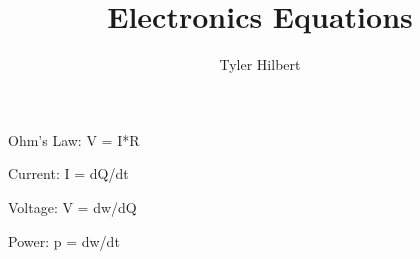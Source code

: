 \documentclass{article}
\begin{document}
\title{Electronics Equations}
\author{Tyler Hilbert}
\date{}
\maketitle

Ohm's Law:
V = I*R

\bigskip

Current:
I = dQ/dt

Voltage:
V = dw/dQ

Power:
p = dw/dt
\end{document}
